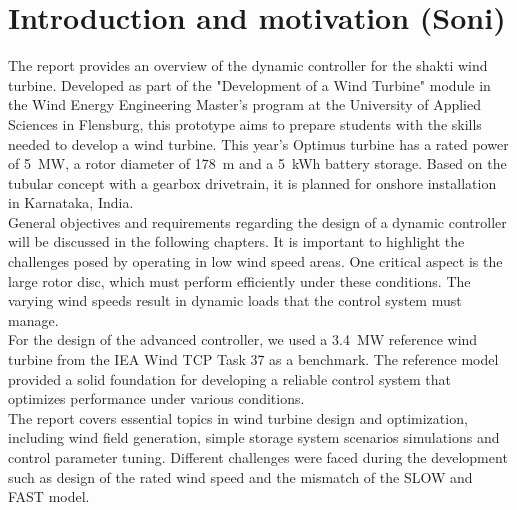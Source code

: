 \chapter{Introduction and motivation (Soni)}

The report provides an overview of the dynamic controller for the \gls{shakti} wind turbine. Developed as part of the "Development of a Wind Turbine" module in the Wind Energy Engineering Master’s program at the University of Applied Sciences in Flensburg, this prototype aims to prepare students with the skills needed to develop a wind turbine. This year’s Optimus turbine has a rated power of \SI{5}{MW}, a rotor diameter of \SI{178}{m} and a \SI{5}{kWh} battery storage. Based on the tubular concept with a gearbox drivetrain, it is planned for onshore installation in Karnataka, India.
\\[16pt]
General objectives and requirements regarding the design of a dynamic controller will be discussed in the following chapters. It is important to highlight the challenges posed by operating in low wind speed areas. One critical aspect is the large rotor disc, which must perform efficiently under these conditions. The varying wind speeds result in dynamic loads that the control system must manage.
\\[16pt]
For the design of the advanced controller, we used a \SI{3.4}{MW} reference wind turbine from the IEA Wind TCP Task 37 as a benchmark.\cite{IEA} The reference model provided a solid foundation for developing a reliable control system that optimizes performance under various conditions.
\\[16pt]
The report covers essential topics in wind turbine design and optimization, including wind field generation, simple storage system scenarios simulations and control parameter tuning.
Different challenges were faced during the development such as design of the rated wind speed and the mismatch of the \gls{SLOW} and \gls{FAST} model. 
